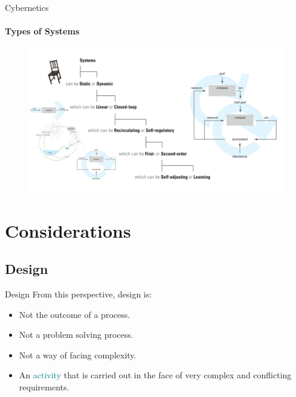 \documentclass[
	11pt,
	aspectratio=169,
]{beamer}
\begin{document}
            \begin{frame}{Cybernetics}
                \framesubtitle{Types of Systems \cite{pangaro_web}}
        		\begin{figure}
        		    \centering
        		    \includegraphics[height=0.75\textheight]{resources/systems.PNG}
        		\end{figure}
            \end{frame}
    \section{Considerations}
        \subsection{Design}
            \begin{frame}{Design}
                From this perspective, design is:
                \begin{itemize}
                    \item<1-> Not the outcome of a process.
                    \item<2-> Not a problem solving process.
                    \item<3-> Not a way of facing complexity.
                    \item<4-> An \textcolor{teal}{activity} that is carried out in the face of very complex and conflicting requirements.
                \end{itemize}
            \end{frame}
\end{document}
